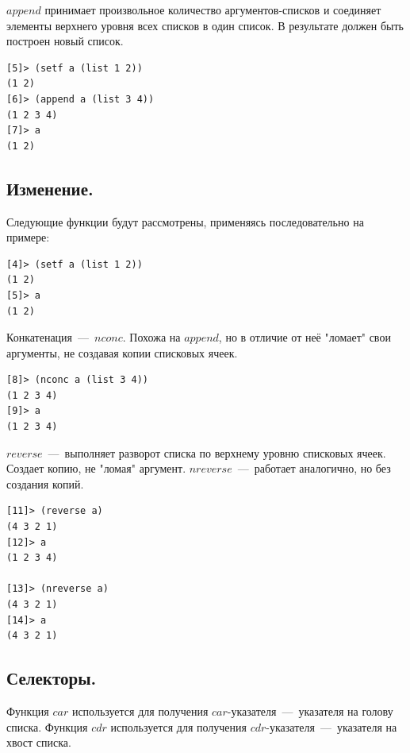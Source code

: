 $append$ принимает произвольное количество аргументов-списков и соединяет элементы верхнего уровня всех списков в один список. В результате должен быть построен новый список.

\begin{code}
\begin{verbatim}
[5]> (setf a (list 1 2))
(1 2)
[6]> (append a (list 3 4))
(1 2 3 4)
[7]> a
(1 2)
\end{verbatim}
\end{code}

\subsection{Изменение.}

Следующие функции будут рассмотрены, применяясь последовательно на примере:
\begin{code}
\begin{verbatim}
[4]> (setf a (list 1 2))
(1 2)
[5]> a
(1 2)
\end{verbatim}
\end{code}

Конкатенация~---~$nconc$. Похожа на $append$, но в отличие от неё "ломает" свои аргументы, не создавая копии списковых ячеек.

\begin{code}
\begin{verbatim}
[8]> (nconc a (list 3 4))
(1 2 3 4)
[9]> a
(1 2 3 4)
\end{verbatim}
\end{code}

$reverse$~---~выполняет разворот списка по верхнему уровню списковых ячеек. Создает копию, не "ломая" аргумент. $nreverse$~---~работает аналогично, но без создания копий.

\begin{code}
\begin{verbatim}
[11]> (reverse a)
(4 3 2 1)
[12]> a
(1 2 3 4)

[13]> (nreverse a)
(4 3 2 1)
[14]> a
(4 3 2 1)
\end{verbatim}
\end{code}

\subsection{Селекторы.}
Функция $car$ используется для получения $car$-указателя~---~указателя на голову списка. Функция $cdr$ используется для получения $cdr$-указателя~---~указателя на хвост списка.

